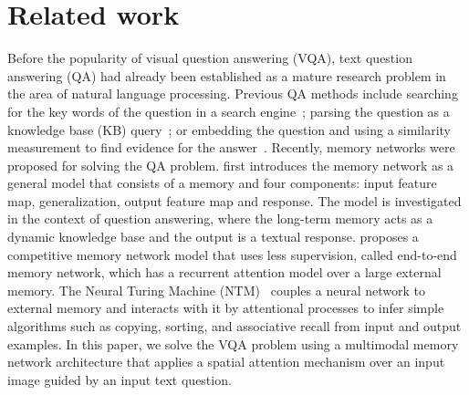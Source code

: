 \vspace{-0.05in}
\section{Related work}\label{sec:related}
\vspace{-0.05in}

Before the popularity of visual question answering (VQA), text question answering (QA) had already been established as a mature research problem in the area of natural language processing. Previous QA methods include searching for the key words of the question in a search engine~\cite{yahya2012natural}; parsing the question as a knowledge base (KB) query~\cite{berant2014semantic}; or embedding the question and using a similarity measurement to find evidence for the answer~\cite{bordes2014question}. 
Recently, memory networks were proposed for solving the QA problem.  \cite{DBLP:journals/corr/WestonCB14} first introduces the memory network as a general model that consists of a memory and four components: input feature map, generalization, output feature map and response. The model is investigated in the context of question answering, where the long-term memory acts as a dynamic knowledge base and the output is a textual response. 
\cite{sukhbaatar2015end} proposes a competitive memory network model that uses less supervision, called end-to-end memory network, which has a recurrent attention model over a large external memory. 
The Neural Turing Machine (NTM)~\cite{graves2014neural} couples a neural network to external memory and interacts with it by attentional processes to infer simple algorithms such as copying, sorting, and associative recall from input and output examples. 
In this paper, we solve the VQA problem using a multimodal memory network architecture that applies a spatial attention mechanism over an input image guided by an input text question. 


